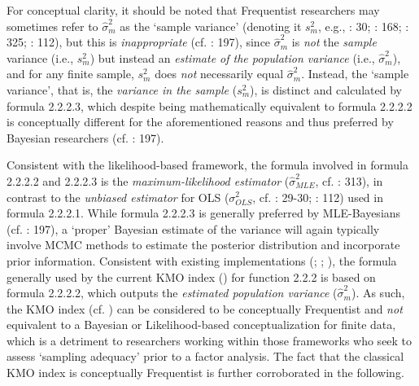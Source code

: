 \documentclass[
  10pt,
  a4paper,
  twoside]{article}
\begin{document}
For conceptual clarity, it should be noted that Frequentist researchers may sometimes refer to \(\hat{\sigma}^2_m\) as the `sample variance' (denoting it \(s^2_m\), e.g., : 30; : 168; : 325; : 112), but this is \emph{inappropriate} (cf. : 197), since \(\hat{\sigma}^2_m\) is \emph{not} the \emph{sample} variance (i.e., \(s^2_m\)) but instead an \emph{estimate of the population variance} (i.e., \(\hat{\sigma}^2_m\)), and for any finite sample, \(s^2_m\) does \emph{not} necessarily equal \(\hat{\sigma}^2_m\). Instead, the `sample variance', that is, the \emph{variance in the sample} (\(s^2_m\)), is distinct and calculated by formula 2.2.2.3, which despite being mathematically equivalent to formula 2.2.2.2 is conceptually different for the aforementioned reasons and thus preferred by Bayesian researchers (cf. : 197).

Consistent with the likelihood-based framework, the formula involved in formula 2.2.2.2 and 2.2.2.3 is the \emph{maximum-likelihood estimator} (\(\hat{\sigma}^2_{MLE}\), cf. : 313), in contrast to the \emph{unbiased estimator} for OLS (\(\sigma^2_{OLS}\), cf. : 29-30; : 112) used in formula 2.2.2.1. While formula 2.2.2.3 is generally preferred by MLE-Bayesians (cf. : 197), a `proper' Bayesian estimate of the variance will again typically involve MCMC methods to estimate the posterior distribution and incorporate prior information. Consistent with existing implementations (; ; ), the formula generally used by the current KMO index () for function 2.2.2 is based on formula 2.2.2.2, which outputs the \emph{estimated population variance} (\(\hat{\sigma}^2_m\)). As such, the KMO index (cf. ) can be considered to be conceptually Frequentist and \emph{not} equivalent to a Bayesian or Likelihood-based conceptualization for finite data, which is a detriment to researchers working within those frameworks who seek to assess `sampling adequacy' prior to a factor analysis. The fact that the classical KMO index is conceptually Frequentist is further corroborated in the following.
\end{document}
